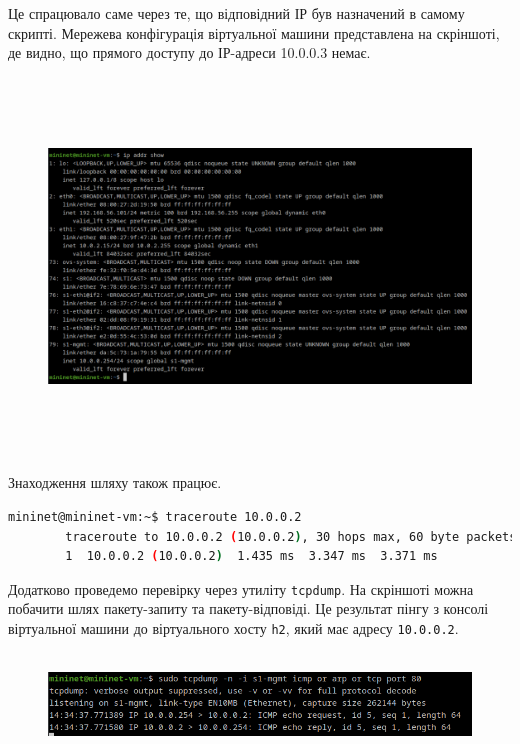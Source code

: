 \documentclass[14pt, a4paper]{extreport}
\begin{document}
	Це спрацювало саме через те, що відповідний ІР був назначений в самому скрипті. Мережева конфігурація віртуальної машини представлена на скріншоті, де видно, що прямого доступу до ІР-адреси 10.0.0.3 немає.
	
	\begin{figure}[H]
		\centering
		\includegraphics[height=10cm]{09} 
	\end{figure}
	
	Знаходження шляху також працює.
	
	\begin{lstlisting}[language=Bash]
		mininet@mininet-vm:~$ traceroute 10.0.0.2
		traceroute to 10.0.0.2 (10.0.0.2), 30 hops max, 60 byte packets
		1  10.0.0.2 (10.0.0.2)  1.435 ms  3.347 ms  3.371 ms\end{lstlisting}
	
	Додатково проведемо перевірку через утиліту \texttt{tcpdump}. На скріншоті можна побачити шлях пакету-запиту та пакету-відповіді. Це результат пінгу з консолі віртуальної машини до віртуального хосту \texttt{h2}, який має адресу \texttt{10.0.0.2}.
	
	\begin{figure}[H]
		\centering
		\includegraphics[height=2.7cm]{10} 
	\end{figure}
	
\end{document}
